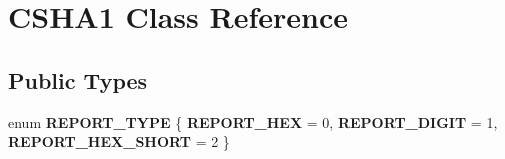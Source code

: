 \hypertarget{class_c_s_h_a1}{\section{C\-S\-H\-A1 Class Reference}
\label{class_c_s_h_a1}
}
\subsection*{Public Types}
\begin{DoxyCompactItemize}
\item 
enum {\bfseries R\-E\-P\-O\-R\-T\-\_\-\-T\-Y\-P\-E} \{ {\bfseries R\-E\-P\-O\-R\-T\-\_\-\-H\-E\-X} = 0, 
{\bfseries R\-E\-P\-O\-R\-T\-\_\-\-D\-I\-G\-I\-T} = 1, 
{\bfseries R\-E\-P\-O\-R\-T\-\_\-\-H\-E\-X\-\_\-\-S\-H\-O\-R\-T} = 2
 \}
\end{DoxyCompactItemize}
